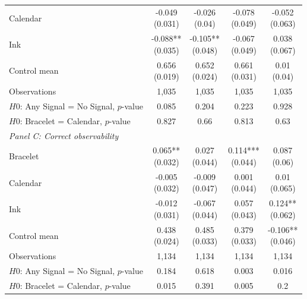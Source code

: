 {\begin{tabular}[t]{lcccc}
Calendar & \makecell[c]{-0.049\\{(0.031)}} & \makecell[c]{-0.026\\{(0.04)}} & \makecell[c]{-0.078\\{(0.049)}} & \makecell[c]{-0.052\\{(0.063)}}\\
Ink & \makecell[c]{-0.088**\\{(0.035)}} & \makecell[c]{-0.105**\\{(0.048)}} & \makecell[c]{-0.067\\{(0.049)}} & \makecell[c]{0.038\\{(0.067)}}\\
\midrule
Control mean & \makecell[c]{0.656\\{(0.019)}} & \makecell[c]{0.652\\{(0.024)}} & \makecell[c]{0.661\\{(0.031)}} & \makecell[c]{0.01\\{(0.04)}}\\
Observations & 1,035 & 1,035 & 1,035 & 1,035\\
$H0$: Any Signal = No Signal, $p$-value & 0.085 & 0.204 & 0.223 & 0.928\\
$H0$: Bracelet = Calendar, $p$-value & 0.827 & 0.66 & 0.813 & 0.63\\
\midrule
\multicolumn{5}{l}{\textit{Panel C: Correct observability}} \\
Bracelet & \makecell[c]{0.065**\\{(0.032)}} & \makecell[c]{0.027\\{(0.044)}} & \makecell[c]{0.114***\\{(0.044)}} & \makecell[c]{0.087\\{(0.06)}}\\
Calendar & \makecell[c]{-0.005\\{(0.032)}} & \makecell[c]{-0.009\\{(0.047)}} & \makecell[c]{0.001\\{(0.044)}} & \makecell[c]{0.01\\{(0.065)}}\\
Ink & \makecell[c]{-0.012\\{(0.031)}} & \makecell[c]{-0.067\\{(0.044)}} & \makecell[c]{0.057\\{(0.043)}} & \makecell[c]{0.124**\\{(0.062)}}\\
\midrule
Control mean & \makecell[c]{0.438\\{(0.024)}} & \makecell[c]{0.485\\{(0.033)}} & \makecell[c]{0.379\\{(0.033)}} & \makecell[c]{-0.106**\\{(0.046)}}\\
Observations & 1,134 & 1,134 & 1,134 & 1,134\\
$H0$: Any Signal = No Signal, $p$-value & 0.184 & 0.618 & 0.003 & 0.016\\
$H0$: Bracelet = Calendar, $p$-value & 0.015 & 0.391 & 0.005 & 0.2\\
\bottomrule
\end{tabular}}
